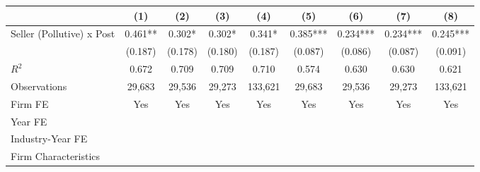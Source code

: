 {
\def\sym#1{\ifmmode^{#1}\else\(^{#1}\)\fi}
\begin{tabular}{l*{8}{c}}
\toprule
                    &\multicolumn{1}{c}{(1)}   &\multicolumn{1}{c}{(2)}   &\multicolumn{1}{c}{(3)}   &\multicolumn{1}{c}{(4)}   &\multicolumn{1}{c}{(5)}   &\multicolumn{1}{c}{(6)}   &\multicolumn{1}{c}{(7)}   &\multicolumn{1}{c}{(8)}   \\
\midrule
Seller (Pollutive) x Post&       0.461** &       0.302*  &       0.302*  &       0.341*  &       0.385***&       0.234***&       0.234***&       0.245***\\
                    &     (0.187)   &     (0.178)   &     (0.180)   &     (0.187)   &     (0.087)   &     (0.086)   &     (0.087)   &     (0.091)   \\
\midrule
\(R^{2}\)           &       0.672   &       0.709   &       0.709   &       0.710   &       0.574   &       0.630   &       0.630   &       0.621   \\
Observations        &      29,683   &      29,536   &      29,273   &     133,621   &      29,683   &      29,536   &      29,273   &     133,621   \\
Firm FE             &         Yes   &         Yes   &         Yes   &         Yes   &         Yes   &         Yes   &         Yes   &         Yes   \\
Year FE             &               &               &               &               &               &               &               &               \\
Industry-Year FE    &               &               &               &               &               &               &               &               \\
Firm Characteristics&               &               &               &               &               &               &               &               \\
\bottomrule
\end{tabular}
}
